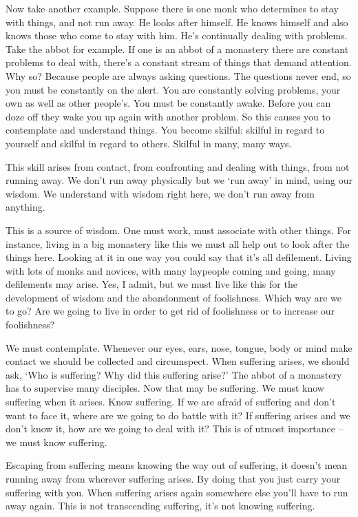 Now take another example. Suppose there is one monk who determines to stay with things, and not run away. He looks after himself. He knows himself and also knows those who come to stay with him. He's continually dealing with problems. Take the abbot for example. If one is an abbot of a monastery there are constant problems to deal with, there's a constant stream of things that demand attention. Why so? Because people are always asking questions. The questions never end, so you must be constantly on the alert. You are constantly solving problems, your own as well as other people's. You must be constantly awake. Before you can doze off they wake you up again with another problem. So this causes you to contemplate and understand things. You become skilful: skilful in regard to yourself and skilful in regard to others. Skilful in many, many ways.

This skill arises from contact, from confronting and dealing with things, from not running away. We don't run away physically but we `run away' in mind, using our wisdom. We understand with wisdom right here, we don't run away from anything.

This is a source of wisdom. One must work, must associate with other things. For instance, living in a big monastery like this we must all help out to look after the things here. Looking at it in one way you could say that it's all defilement. Living with lots of monks and novices, with many laypeople coming and going, many defilements may arise. Yes, I admit, but we must live like this for the development of wisdom and the abandonment of foolishness. Which way are we to go? Are we going to live in order to get rid of foolishness or to increase our foolishness?

We must contemplate. Whenever our eyes, ears, nose, tongue, body or mind make contact we should be collected and circumspect. When suffering arises, we should ask, `Who is suffering? Why did this suffering arise?' The abbot of a monastery has to supervise many disciples. Now that may be suffering. We must know suffering when it arises. Know suffering. If we are afraid of suffering and don't want to face it, where are we going to do battle with it? If suffering arises and we don't know it, how are we going to deal with it? This is of utmost importance -- we must know suffering.

Escaping from suffering means knowing the way out of suffering, it doesn't mean running away from wherever suffering arises. By doing that you just carry your suffering with you. When suffering arises again somewhere else you'll have to run away again. This is not transcending suffering, it's not knowing suffering.

